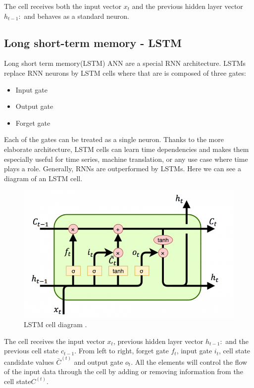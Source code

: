 \documentclass{kththesis}
\begin{document}
The cell receives both the input vector $x_{t}$ and the previous hidden layer vector $h_{t-1}:$ and behaves as a standard neuron.

\subsection{Long short-term memory - LSTM}
Long short term memory(LSTM) ANN are a special RNN architecture\cite{lstm-author}. LSTMs replace RNN neurons by LSTM cells where that are is composed of three gates:
\begin{itemize}
    \item Input gate
    \item Output gate
    \item Forget gate
\end{itemize}

Each of the gates can be treated as a single neuron. Thanks to the more elaborate architecture, LSTM cells can learn time dependencies and makes them especially useful for time series, machine translation, or any use case where time plays a role. Generally, RNNs are outperformed by LSTMs. Here we can see a diagram of an LSTM cell.

\begin{figure}[H]
    \centering
    \includegraphics[scale=0.6]{LSTM-Core.png}
    \caption{LSTM cell diagram  \cite{daniel}.}
    
\end{figure}

The cell receives the input vector $x_{t}$, previous hidden layer vector $h_{t-1}:$ and the previous cell state $c_{t-1}$. From left to right, forget gate $f_t$, input gate $i_{t}$, cell state candidate values $\bar{C}^{(t)}$ and output gate $o_{t}$. All the elements will control the flow of the input data through the cell by adding or removing information from the cell state$C^{(t)}$.
\end{document}
